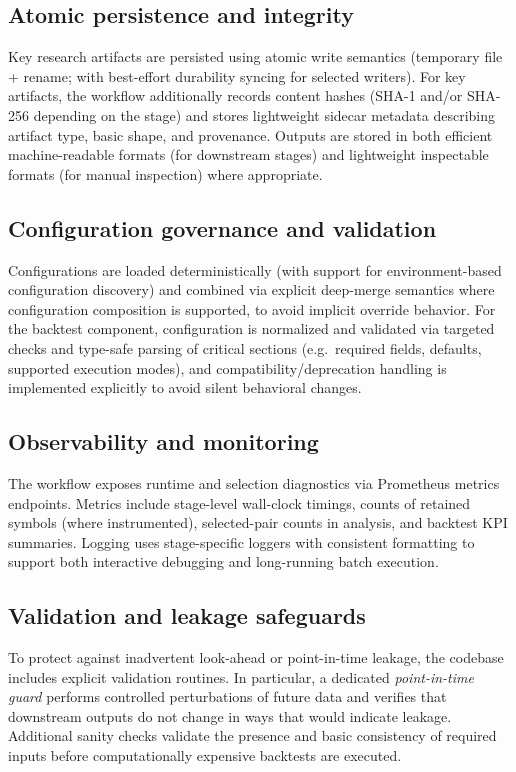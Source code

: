 \documentclass[11pt,a4paper]{article}
\begin{document}
\subsection*{Atomic persistence and integrity}
Key research artifacts are persisted using atomic write semantics (temporary
file + rename; with best-effort durability syncing for selected writers). For
key artifacts, the workflow additionally records content hashes (SHA-1 and/or
SHA-256 depending on the stage) and stores lightweight sidecar metadata
describing artifact type, basic shape, and provenance. Outputs are stored in
both efficient machine-readable formats (for downstream stages) and lightweight
inspectable formats (for manual inspection) where appropriate.

\subsection*{Configuration governance and validation}
Configurations are loaded deterministically (with support for environment-based
configuration discovery) and combined via explicit deep-merge semantics where
configuration composition is supported, to avoid implicit override behavior.
For the backtest component, configuration is normalized and validated via
targeted checks and type-safe parsing of critical sections (e.g.\ required
fields, defaults, supported execution modes), and compatibility/deprecation
handling is implemented explicitly to avoid silent behavioral changes.

\subsection*{Observability and monitoring}
The workflow exposes runtime and selection diagnostics via Prometheus metrics
endpoints. Metrics include stage-level wall-clock timings, counts of retained
symbols (where instrumented), selected-pair counts in analysis, and backtest
KPI summaries. Logging uses stage-specific loggers with consistent formatting to
support both interactive debugging and long-running batch execution.

\subsection*{Validation and leakage safeguards}
To protect against inadvertent look-ahead or point-in-time leakage, the
codebase includes explicit validation routines. In particular, a dedicated
\emph{point-in-time guard} performs controlled perturbations of future data and
verifies that downstream outputs do not change in ways that would indicate
leakage. Additional sanity checks validate the presence and basic consistency
of required inputs before computationally expensive backtests are executed.
\end{document}

